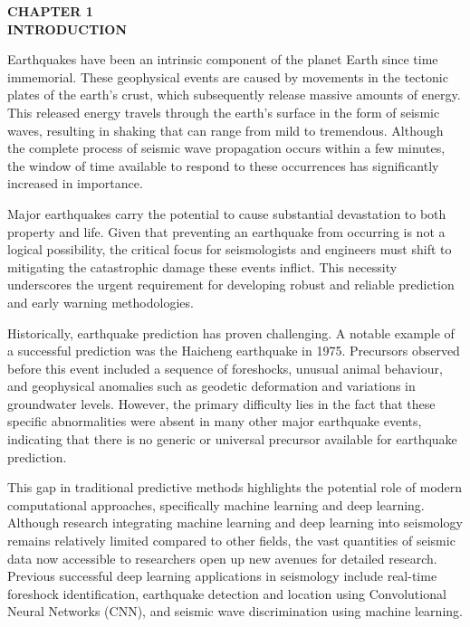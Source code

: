 \begin{center}
    \Large\textbf{CHAPTER 1} \\
    \vspace{0.2cm}
    \Large\textbf{INTRODUCTION}
\end{center}

\vspace{0.5cm}

\justify{}
\vspace{0.2cm}

{\fontsize{12pt}{18pt}\selectfont
Earthquakes have been an intrinsic component of the planet Earth since time immemorial. These geophysical events are caused by movements in the tectonic plates of the earth’s crust, which subsequently release massive amounts of energy. This released energy travels through the earth’s surface in the form of seismic waves, resulting in shaking that can range from mild to tremendous. Although the complete process of seismic wave propagation occurs within a few minutes, the window of time available to respond to these occurrences has significantly increased in importance.

Major earthquakes carry the potential to cause substantial devastation to both property and life. Given that preventing an earthquake from occurring is not a logical possibility, the critical focus for seismologists and engineers must shift to mitigating the catastrophic damage these events inflict. This necessity underscores the urgent requirement for developing robust and reliable prediction and early warning methodologies.

Historically, earthquake prediction has proven challenging. A notable example of a successful prediction was the Haicheng earthquake in 1975. Precursors observed before this event included a sequence of foreshocks, unusual animal behaviour, and geophysical anomalies such as geodetic deformation and variations in groundwater levels. However, the primary difficulty lies in the fact that these specific abnormalities were absent in many other major earthquake events, indicating that there is no generic or universal precursor available for earthquake prediction.

This gap in traditional predictive methods highlights the potential role of modern computational approaches, specifically machine learning and deep learning. Although research integrating machine learning and deep learning into seismology remains relatively limited compared to other fields, the vast quantities of seismic data now accessible to researchers open up new avenues for detailed research. Previous successful deep learning applications in seismology include real-time foreshock identification, earthquake detection and location using Convolutional Neural Networks (CNN), and seismic wave discrimination using machine learning.

}

